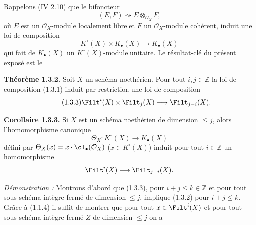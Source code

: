 Rappelons (IV 2.10) que le bifoncteur
\[
(E,F)\rightsquigarrow E\otimes_{\mathcal O_X}F,
\]
où $E$ est un $\mathcal O_X$-module localement libre et $F$ un $\mathcal O_X$-module cohérent, induit une loi de composition
\begin{equation}\tag{1.3.1}
K^\circ(X)\times K_\bullet(X)\longrightarrow K_\bullet(X)
\end{equation}
qui fait de $K_\bullet(X)$ un $K^\circ(X)$-module unitaire. Le résultat-clé du présent exposé est le

\textbf{Théorème 1.3.2.} Soit $X$ un schéma noethérien. Pour tout $i,j\in\mathbb Z$ la loi de composition (1.3.1) induit par restriction une loi de composition
\begin{equation}\tag{1.3.3}
\Filt^i(X)\times\Filt_j(X)\longrightarrow\Filt_{j-i}(X).
\end{equation}

\textbf{Corollaire 1.3.3.} Si $X$ est un schéma noethérien de dimension $\leq j$, alors l'homomorphisme canonique
\[
\Theta_X:K^\circ(X)\longrightarrow K_\bullet(X)
\]
défini par $\Theta_X(x)=x\cdot\cl_\bullet(\mathcal O_X)$ ($x\in K^\circ(X)$) induit pour tout $i\in\mathbb Z$ un homomorphisme
\[
\Filt^i(X)\longrightarrow\Filt_{j-i}(X).
\]

\emph{Démonstration :} Montrons d'abord que (1.3.3), pour $i+j\leq k\in\mathbb Z$ et pour tout sous-schéma intègre fermé de dimension $\leq j$, implique (1.3.2) pour $i+j\leq k$. Grâce à (1.1.4) il suffit de montrer que pour tout $x\in\Filt^i(X)$ et pour tout sous-schéma intègre fermé $Z$ de dimension $\leq j$ on a
